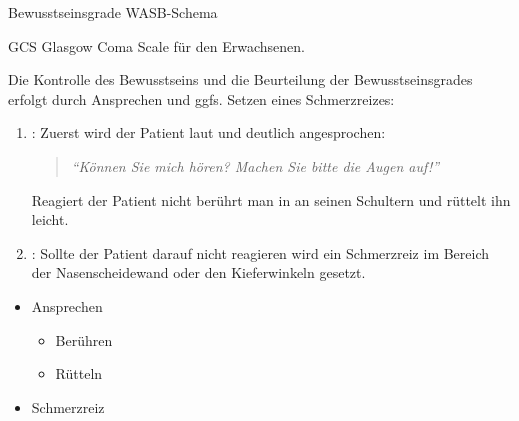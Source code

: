 \TableWide
{Bewusstseinsgrade}%
{WASB-Schema}%
{\label{tab:bewusstseinsgrade-apam}}%
{}%
{}%
{{\protect}}%
{}%



%
%

\Table
{GCS}%
{Glasgow Coma Scale für den Erwachsenen.}%
{\label{tab:gcs-apam}}%
{}%
{}%
{{\protect}}%
{}%



{%
Die Kontrolle des Bewusstseins und die Beurteilung der 
Bewusstseinsgrades erfolgt durch Ansprechen und ggfs. Setzen eines 
Schmerzreizes: 
\begin{enumerate}
  \item {}: Zuerst wird der Patient laut und 
  deutlich angesprochen:  
  \begin{quote}
     \emph{\enquote{Können Sie mich hören? Machen Sie bitte die Augen
     auf!}}
  \end{quote}
  Reagiert der Patient nicht berührt man in an seinen Schultern und 
  rüttelt ihn leicht.  
  \item {}: Sollte der Patient darauf nicht 
  reagieren wird ein Schmerzreiz im Bereich der Nasenscheidewand oder 
  den Kieferwinkeln gesetzt. 
\end{enumerate}
}{%
\begin{itemize}
  \item Ansprechen
  \begin{itemize}
    \item Berühren
    \item Rütteln
  \end{itemize}
  \item Schmerzreiz 
\end{itemize}
}{}{}{}

